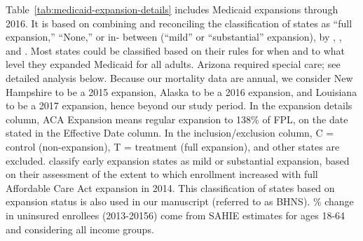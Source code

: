\documentclass[12pt]{article}%
\begin{document}
\begin{appendices}

Table~\ref{tab:medicaid-expansion-details} includes Medicaid expansions through 2016. 
It is based on combining and reconciling the classification of states as ``full expansion,'' ``None,'' or in- between (``mild'' or ``substantial'' expansion), by \citet{simonImpactHealthInsurance2017}, \citet{louq.moghtaderiImpactMedicaidExpansion2018}, and \citet{kaiserfamilyfoundationStatusStateAction2018}. 
Most states could be classified based on their rules for when and to what level they expanded Medicaid for all adults. Arizona required special care; see detailed analysis below. Because our mortality data are annual, we consider New Hampshire to be a 2015 expansion, Alaska to be a 2016 expansion, and Louisiana to be a 2017 expansion, hence beyond our study period.
In the expansion details column, ACA Expansion means regular expansion to 138\% of FPL, on the date stated in the Effective Date column. 
In the inclusion/exclusion column, C = control (non-expansion), T = treatment (full expansion), and other states are excluded. 
\citet{simonImpactHealthInsurance2017} classify early expansion states as mild or substantial expansion, based on their assessment of the extent to which enrollment increased with full Affordable Care Act expansion in 2014. 
This classification of states based on expansion status is also used in our manuscript (referred to as BHNS). 
\% change in uninsured enrollees (2013-20156) come from SAHIE estimates for ages 18-64 and considering all income groups.



\end{appendices}
\end{document}
